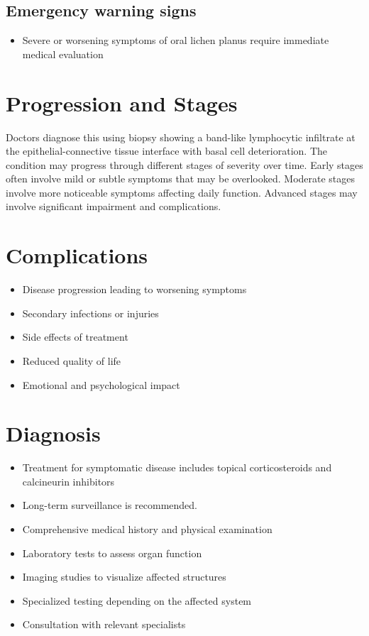 \subsection{Emergency warning signs}
\begin{itemize}[noitemsep]
  \item Severe or worsening symptoms of oral lichen planus require immediate medical evaluation
\end{itemize}
\section{Progression and Stages}
Doctors diagnose this using biopsy showing a band-like lymphocytic infiltrate at the epithelial-connective tissue interface with basal cell deterioration. The condition may progress through different stages of severity over time. Early stages often involve mild or subtle symptoms that may be overlooked. Moderate stages involve more noticeable symptoms affecting daily function. Advanced stages may involve significant impairment and complications.
\section{Complications}
\begin{itemize}[noitemsep]
  \item Disease progression leading to worsening symptoms
  \item Secondary infections or injuries
  \item Side effects of treatment
  \item Reduced quality of life
  \item Emotional and psychological impact
\end{itemize}
\section{Diagnosis}
\begin{itemize}[noitemsep]
  \item Treatment for symptomatic disease includes topical corticosteroids and calcineurin inhibitors
  \item Long-term surveillance is recommended.
  \item Comprehensive medical history and physical examination
  \item Laboratory tests to assess organ function
  \item Imaging studies to visualize affected structures
  \item Specialized testing depending on the affected system
  \item Consultation with relevant specialists
\end{itemize}
